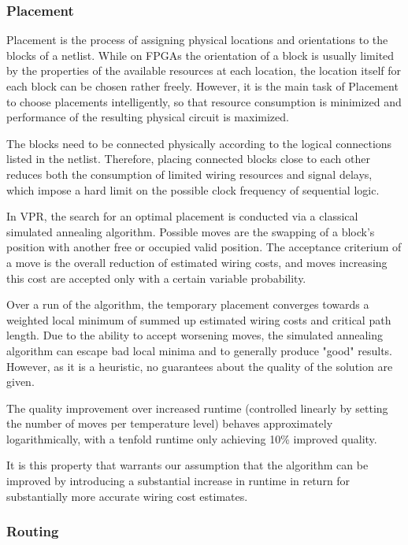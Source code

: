 \subsubsection{Placement}

Placement is the process of assigning physical locations and orientations to the blocks of a netlist. While on \glspl{FPGA} the orientation of a block is usually limited by the properties of the available resources at each location, the location itself for each block can be chosen rather freely. However, it is the main task of Placement to choose placements intelligently, so that resource consumption is minimized and performance of the resulting physical circuit is maximized.

The blocks need to be connected physically according to the logical connections listed in the netlist. Therefore, placing connected blocks close to each other reduces both the consumption of limited wiring resources and signal delays, which impose a hard limit on the possible clock frequency of sequential logic.

\pagebreak

In \gls{VPR}, the search for an optimal placement is conducted via a classical simulated annealing algorithm. Possible moves are the swapping of a block's position with another free or occupied valid position. The acceptance criterium of a move is the overall reduction of estimated wiring costs, and moves increasing this cost are accepted only with a certain variable probability.

Over a run of the algorithm, the temporary placement converges towards a weighted local minimum of summed up estimated wiring costs and critical path length. Due to the ability to accept worsening moves, the simulated annealing algorithm can escape bad local minima and to generally produce "good" results. However, as it is a heuristic, no guarantees about the quality of the solution are given.

The quality improvement over increased runtime (controlled linearly by setting the number of moves per temperature level) behaves approximately logarithmically, with a tenfold runtime only achieving 10\% improved quality\cite{vtr8}.

It is this property that warrants our assumption that the algorithm can be improved by introducing a substantial increase in runtime in return for substantially more accurate wiring cost estimates.

\subsubsection{Routing}

